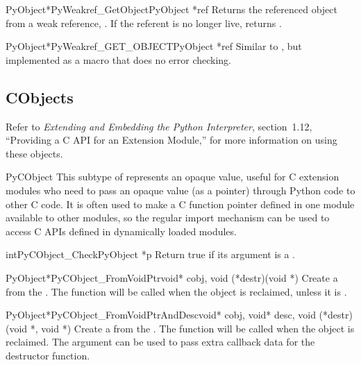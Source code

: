 \begin{cfuncdesc}{PyObject*}{PyWeakref_GetObject}{PyObject *ref}
  Returns the referenced object from a weak reference, .  If
  the referent is no longer live, returns .
\end{cfuncdesc}

\begin{cfuncdesc}{PyObject*}{PyWeakref_GET_OBJECT}{PyObject *ref}
  Similar to , but implemented as a
  macro that does no error checking.
\end{cfuncdesc}


\subsection{CObjects \label{cObjects}}

Refer to \emph{Extending and Embedding the Python Interpreter},
section~1.12, ``Providing a C API for an Extension Module,'' for more
information on using these objects.


\begin{ctypedesc}{PyCObject}
  This subtype of  represents an opaque value, useful
  for C extension modules who need to pass an opaque value (as a
   pointer) through Python code to other C code.  It is
  often used to make a C function pointer defined in one module
  available to other modules, so the regular import mechanism can be
  used to access C APIs defined in dynamically loaded modules.
\end{ctypedesc}

\begin{cfuncdesc}{int}{PyCObject_Check}{PyObject *p}
  Return true if its argument is a .
\end{cfuncdesc}

\begin{cfuncdesc}{PyObject*}{PyCObject_FromVoidPtr}{void* cobj,
                                                    void (*destr)(void *)}
  Create a  from the .  The
   function will be called when the object is reclaimed,
  unless it is \NULL{}.
\end{cfuncdesc}

\begin{cfuncdesc}{PyObject*}{PyCObject_FromVoidPtrAndDesc}{void* cobj,
	                          void* desc, void (*destr)(void *, void *)}
  Create a  from the .  The
   function will be called when the object is reclaimed.
  The  argument can be used to pass extra callback data for
  the destructor function.
\end{cfuncdesc}

